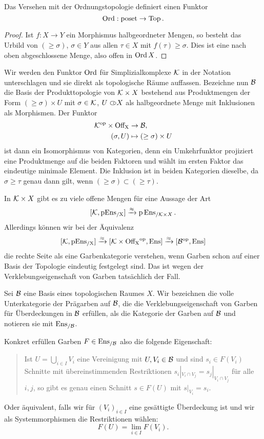 \begin{lemma} \label{ord-functor}
  Das Versehen mit der Ordnungstopologie definiert einen Funktor
  \[ \operatorname{Ord}: \operatorname{poset} \to \operatorname{Top} . \]
\end{lemma}
\begin{proof}
  Ist $f: X \to Y$ ein Morphismus halbgeordneter Mengen, so besteht
  das Urbild von $(\geq \sigma)$, $\sigma \in Y$ aus allen $\tau \in
  X$ mit $f(\tau) \geq \sigma$. Dies ist eine nach oben abgeschlossene
  Menge, also offen in $\operatorname{Ord} X$.
\end{proof}
Wir werden den Funktor $\operatorname{Ord}$ für Simplizialkomplexe $\mathcal{K}$ in der
Notation unterschlagen und sie direkt als topologische Räume
auffassen. Bezeichne nun $\mathcal{B}$ die Basis der Produkttopologie von $\mathcal{K}
\times X$ bestehend aus Produktmengen der Form $(\geq \sigma) \times
U$ mit $\sigma \in \mathcal{K}$, $U \subset\kern-0.58em\circ X$ als halbgeordnete Menge mit
Inklusionen als Morphismen. Der Funktor
\begin{align} \label{eq:prod-base}
  \mathcal{K}^\mathrm{op} \times \operatorname{Off_X} &\to \mathcal{B}, \\
  (\sigma, U) &\mapsto (\geq \sigma) \times U
\end{align}
ist dann ein Isomorphismus von Kategorien, denn ein Umkehrfunktor
projiziert eine Produktmenge auf die beiden Faktoren und wählt im
ersten Faktor das eindeutige minimale Element. Die Inklusion ist in
beiden Kategorien dieselbe, da $\sigma \geq \tau$ genau dann gilt,
wenn $(\geq \sigma) \subset (\geq \tau)$.

In $\mathcal{K} \times X$ gibt es zu viele offene Mengen für eine Aussage der
Art
\[
  [\mathcal{K}, \operatorname{pEns_{/X}}] \xrightarrow{\approx} \operatorname{p}\operatorname{Ens}_{/\mathcal{K} \times X}.
\]
Allerdings können wir bei der Äquivalenz
\begin{equation} \label{eq:simp-comp-presheaf}
  [\mathcal{K}, \operatorname{pEns_{/X}}]
  \xrightarrow{\approx} {[\mathcal{K} \times \operatorname{Off_X}^\mathrm{op}, \operatorname{Ens}]}
  \xrightarrow{\approx} {[\mathcal{B}^\mathrm{op}, \operatorname{Ens}]}
\end{equation}
die rechte Seite als eine Garbenkategorie verstehen, wenn Garben schon
auf einer Basis der Topologie eindeutig festgelegt sind. Das ist wegen
der Verklebungseigenschaft von Garben tatsächlich der Fall.
\begin{defn}
  Sei $\mathcal{B}$ eine Basis eines topologischen Raumes $X$.  Wir bezeichnen
  die volle Unterkategorie der Prägarben auf $\mathcal{B}$, die die
  Verklebungseigenschaft von Garben für Überdeckungen in $\mathcal{B}$
  erfüllen, als die Kategorie der Garben auf $\mathcal{B}$ und notieren sie mit
  $\operatorname{Ens_{/\mathcal{B}}}$.
\end{defn}
Konkret erfüllen Garben $F \in \operatorname{Ens_{/\mathcal{B}}}$ also die folgende Eigenschaft:
\begin{quote}
  Ist $U = \bigcup_{i \in I} V_i$ eine Vereinigung mit $U, V_i \in
  \mathcal{B}$ und sind $s_i \in F(V_i)$ Schnitte mit
  übereinstimmenden Restriktionen $s_i |_{V_i \cap V_j} = s_j |_{V_i
    \cap V_j}$ für alle $i, j$, so gibt es genau einen Schnitt $s \in
  F(U)$ mit $s |_{V_i} = s_i$.
\end{quote}
Oder äquivalent, falls wir für $(V_i)_{i \in I}$ eine gesättigte
Überdeckung ist und wir als Systemmorphismen die Restriktionen wählen:
\[ F(U) = \lim_{i \in I} F(V_i) . \]

